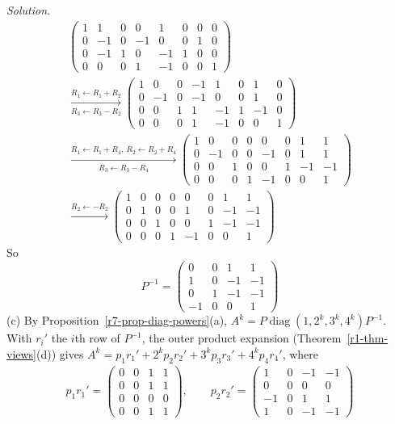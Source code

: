 \documentclass[12pt]{article}
\DeclareMathOperator{\diag}{diag}
\theoremstyle{definition}
\newenvironment{solution}{\par\noindent\textit{Solution.}\ }{\par\smallskip}
\begin{document}
\begin{solution}
\[\begin{gathered}
\left(\begin{array}{cccc|cccc}1&1&0&0&1&0&0&0\\0&-1&0&-1&0&0&1&0\\0&-1&1&0&-1&1&0&0\\0&0&0&1&-1&0&0&1\end{array}\right)
\\
\xrightarrow[R_3\leftarrow R_3-R_2]{R_1\leftarrow R_1+R_2}
\left(\begin{array}{cccc|cccc}1&0&0&-1&1&0&1&0\\0&-1&0&-1&0&0&1&0\\0&0&1&1&-1&1&-1&0\\0&0&0&1&-1&0&0&1\end{array}\right)
\\
\xrightarrow[R_3\leftarrow R_3-R_4]{R_1\leftarrow R_1+R_4,\ R_2\leftarrow R_2+R_4}
\left(\begin{array}{cccc|cccc}1&0&0&0&0&0&1&1\\0&-1&0&0&-1&0&1&1\\0&0&1&0&0&1&-1&-1\\0&0&0&1&-1&0&0&1\end{array}\right)
\\
\xrightarrow{R_2\leftarrow-R_2}
\left(\begin{array}{cccc|cccc}1&0&0&0&0&0&1&1\\0&1&0&0&1&0&-1&-1\\0&0&1&0&0&1&-1&-1\\0&0&0&1&-1&0&0&1\end{array}\right)
\end{gathered}
\]
So
\[
P^{-1}=\begin{pmatrix}0&0&1&1\\1&0&-1&-1\\0&1&-1&-1\\-1&0&0&1\end{pmatrix}
\]
(c) By Proposition~\ref{r7-prop-diag-powers}(a), \(A^k=P\diag(1,2^k,3^k,4^k)P^{-1}\). With \(r_i'\) the \(i\)th row of
\(P^{-1}\), the outer product expansion (Theorem~\ref{r1-thm-views}(d)) gives
\(A^k=p_1r_1'+2^kp_2r_2'+3^kp_3r_3'+4^kp_4r_4'\), where
\[
\begin{gathered}
p_1r_1'=\begin{pmatrix}0&0&1&1\\0&0&1&1\\0&0&0&0\\0&0&1&1\end{pmatrix},\qquad
p_2r_2'=\begin{pmatrix}1&0&-1&-1\\0&0&0&0\\-1&0&1&1\\1&0&-1&-1\end{pmatrix}\\

\end{gathered}\]
\end{solution}
\end{document}
